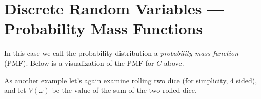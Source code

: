 \section{Discrete Random Variables --- Probability Mass Functions}
In this case we call the probability distribution a \emph{probability mass function} (PMF). 
Below is a visualization of the PMF for $C$ above. 

\begin{center}
\end{center}

As another example let's again examine rolling two dice (for simplicity, 4 sided), 
and let $V(\omega)$ be the value of the sum of the two rolled dice. 

